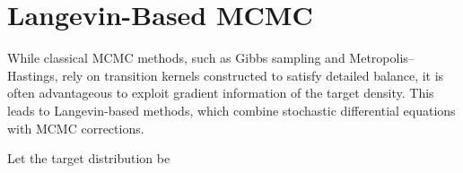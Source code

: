 \documentclass[11pt, twoside]{report}
\begin{document}

\section{Langevin-Based MCMC}

While classical MCMC methods, such as Gibbs sampling and Metropolis--Hastings, rely on transition kernels constructed to satisfy 
detailed balance, it is often advantageous to exploit gradient information of the target density. 
This leads to Langevin-based methods, which combine stochastic differential equations 
with MCMC corrections.

Let the target distribution be
\end{document}
